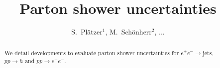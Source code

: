 \documentclass[11pt]{cernrep}
\begin{document}
\title{Parton shower uncertainties}

\author{
  S.\ Pl\"atzer$^1$,
  M.\ Sch\"onherr$^2$,
  ...
}

\maketitle

\begin{abstract}
  We detail developments to evaluate parton shower uncertainties 
  for $e^+e^-\to\text{jets}$, $pp\to h$ and $pp\to e^+e^-$.
\end{abstract}






\end{document}

